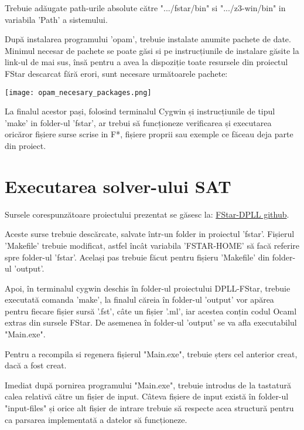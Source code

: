 Trebuie adăugate path-urile absolute către ".../fstar/bin" si ".../z3-win/bin" in variabila 'Path' a sistemului.

După instalarea programului 'opam', trebuie instalate anumite pachete de date. Minimul necesar de pachete se poate găsi si pe instrucțiunile de instalare găsite la link-ul de mai sus, însă pentru a avea la dispoziție toate resursele din proiectul FStar descarcat fără erori, sunt necesare următoarele pachete: 
\newline

\texttt{[image: opam\_necesary\_packages.png]}
\newline

La finalul acestor pași, folosind terminalul Cygwin și instrucțiunile de tipul 'make' in folder-ul 'fstar', ar trebui să funcționeze verificarea și executarea oricăror fișiere surse scrise in F*, fișiere proprii sau exemple ce făceau deja parte din proiect.

\newpage

\section{Executarea solver-ului SAT}

Sursele corespunzătoare proiectului prezentat se găsesc la:
\href{https://github.com/alex4482/FStar-DPLL-licenta/tree/main/dpll_optimized}{FStar-DPLL github}.

Aceste surse trebuie descărcate, salvate într-un folder in proiectul 'fstar'. \newline Fișierul 'Makefile' trebuie modificat, astfel încât variabila 'FSTAR-HOME'  să facă \newline referire spre folder-ul 'fstar'. Același pas trebuie făcut pentru fișieru 'Makefile' din \newline folder-ul 'output'.

Apoi, în terminalul cygwin deschis în folder-ul proiectului DPLL-FStar, trebuie executată comanda 'make', la finalul căreia în folder-ul 'output' vor apărea pentru \newline fiecare fișier sursă '.fst', câte un fișier '.ml', iar acestea conțin codul Ocaml extras din sursele FStar. De asemenea în folder-ul 'output' se va afla executabilul "Main.exe".

Pentru a recompila si regenera fișierul "Main.exe", trebuie șters cel anterior creat, dacă a fost creat.

Imediat după pornirea programului "Main.exe", trebuie introdus de la tastatură calea relativă către un fișier de input. Câteva fișiere de input există în folder-ul \newline "input-files" și orice alt fișier de intrare trebuie să respecte acea structură pentru ca parsarea implementată a datelor să funcționeze.

